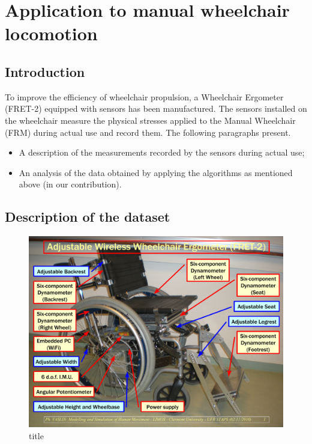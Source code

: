 \chapter{Application to manual wheelchair locomotion}
\section{Introduction}
To improve the efficiency of wheelchair propulsion, a Wheelchair Ergometer (FRET-2) equipped with sensors has been manufactured. The sensors installed on the wheelchair measure the physical stresses applied to the Manual Wheelchair (FRM) during actual use and record them. The following paragraphs present.
\begin{itemize}
\item A description of the measurements recorded by the sensors during actual use;
\item An analysis of the data obtained by applying  the algorithms as mentioned above (in our contribution).
\end{itemize}

\begin{flushright}

\end{flushright}
\section{Description of the dataset}

\begin{figure}[h]
\center
\includegraphics[scale = 0.4]{images/FRET-2_Legend_GB}
\caption{title}
\label{fret_legend}
\end{figure}


